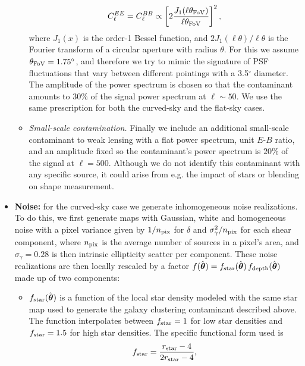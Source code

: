\documentclass[usenatbib]{mnrasb}
\newcommand{\nv}{\hat{\boldsymbol{\theta}}}
\begin{document}
\begin{itemize}
\begin{itemize}
            \begin{equation}
              C^{EE}_\ell=C^{BB}_\ell\propto\left[2\frac{J_1(\ell\theta_{\rm FoV})}{\ell\theta_{\rm FoV}}\right]^2,
            \end{equation}
            where $J_1(x)$ is the order-1 Bessel function, and $2J_1(\ell\theta)/\ell\theta$ is the Fourier transform of a circular aperture with radius $\theta$. For this we assume $\theta_{\rm FoV}=1.75^\circ$, and therefore we try to mimic the signature of PSF fluctuations that vary between different pointings with a 3.5$^\circ$ diameter. The amplitude of the power spectrum is chosen so that the contaminant amounts to $30\%$ of the signal power spectrum at $\ell\sim50$. We use the same prescription for both the curved-sky and the flat-sky cases. 
            \item {\sl Small-scale contamination.} Finally we include an additional small-scale contaminant to weak lensing with a flat power spectrum, unit $E$-$B$ ratio, and an amplitude fixed so the contaminant's power spectrum is $20\%$ of the signal at $\ell=500$. Although we do not identify this contaminant with any specific source, it could arise from e.g. the impact of stars or blending on shape measurement.
          \end{itemize}
          \item {\bf Noise:} for the curved-sky case we generate inhomogeneous noise realizations. To do this, we first generate maps with Gaussian, white and homogeneous noise with a pixel variance given by $1/n_{\rm pix}$ for $\delta$ and $\sigma_\gamma^2/n_{\rm pix}$ for each shear component, where $n_{\rm pix}$ is the average number of sources in a pixel's area, and $\sigma_\gamma=0.28$ is then intrinsic ellipticity scatter per component. These noise realizations are then locally rescaled by a factor $f(\nv)=f_{\rm star}(\nv)\,f_{\rm depth}(\nv)$ made up of two components:
          \begin{itemize}
            \item $f_{\rm star}(\nv)$ is a function of the local star density modeled with the same star map used to generate the galaxy clustering contaminant described above. The function interpolates between $f_{\rm star}=1$ for low star densities and $f_{\rm star}=1.5$ for high star densities. The specific functional form used is
            \begin{equation}
              f_{\rm star}=\frac{r_{\rm star}-4}{2r_{\rm star}-4},
            \end{equation}

\end{itemize}
\end{itemize}
\end{document}
